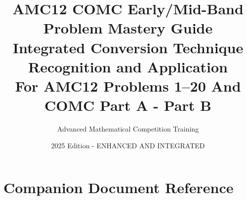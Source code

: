 \documentclass{article}
\begin{document}
\title{\textbf{AMC12 COMC Early/Mid-Band Problem Mastery Guide}\\
\Large Integrated Conversion Technique Recognition and Application \\
\large For AMC12 Problems 1--20 And COMC Part A - Part B}
\author{Advanced Mathematical Competition Training}
\date{2025 Edition - ENHANCED AND INTEGRATED}
\maketitle

\tableofcontents
\newpage

\section*{Companion Document Reference}
\end{document}
